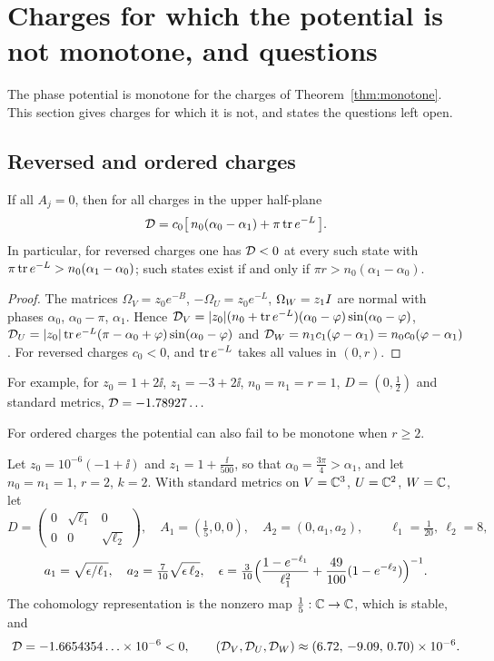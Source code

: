 \section{Charges for which the potential is not monotone, and questions}\label{sec:remarks}

The phase potential is monotone for the charges of
Theorem~\ref{thm:monotone}. This section gives charges for which it is not,
and states the questions left open.

\subsection{Reversed and ordered charges}
\begin{proposition}\label{prop:reversed}
If all $A_j=0$, then for all charges in the upper half-plane
\[
 \mathcal D=c_0\bigl[\,n_0(\alpha_0-\alpha_1)+\pi\operatorname{tr} e^{-L}\,\bigr].
\]
In particular, for reversed charges one has $\mathcal D<0$ at every such state with
$\pi\operatorname{tr} e^{-L}>n_0(\alpha_1-\alpha_0)$; such states exist if and only if
$\pi r>n_0(\alpha_1-\alpha_0)$.
\end{proposition}

\begin{proof}
The matrices $\Omega_V=z_0e^{-B}$, $-\Omega_U=z_0e^{-L}$, $\Omega_W=z_1I$
are normal with phases $\alpha_0$, $\alpha_0-\pi$, $\alpha_1$. Hence
$\mathcal D_V=|z_0|(n_0+\operatorname{tr} e^{-L})(\alpha_0-\varphi)\sin(\alpha_0-\varphi)$,
$\mathcal D_U=|z_0|\operatorname{tr} e^{-L}(\pi-\alpha_0+\varphi)\sin(\alpha_0-\varphi)$ and
$\mathcal D_W=n_1c_1(\varphi-\alpha_1)=n_0c_0(\varphi-\alpha_1)$. For reversed
charges $c_0<0$, and $\operatorname{tr} e^{-L}$ takes all values in $(0,r)$.
\end{proof}

For example, for $z_0=1+2\ii$, $z_1=-3+2\ii$, $n_0=n_1=r=1$, $D=(0,\frac12)$
and standard metrics, $\mathcal D=-1.78927\ldots$

For ordered charges the potential can also fail to be monotone when
$r\geq2$.

\begin{proposition}\label{prop:orderedfailure}
Let $z_0=10^{-6}(-1+\ii)$ and $z_1=1+\frac\ii{500}$, so that
$\alpha_0=\frac{3\pi}4>\alpha_1$, and let $n_0=n_1=1$, $r=2$, $k=2$. With
standard metrics on $V=\mathbb C^3$, $U=\mathbb C^2$, $W=\mathbb C$, let
\[
 D=\begin{pmatrix}0&\sqrt{\ell_1}&0\\0&0&\sqrt{\ell_2}\end{pmatrix},\quad
 A_1=(\tfrac15,0,0),\quad A_2=(0,a_1,a_2),\qquad\ell_1=\tfrac1{20},\ \ell_2=8,
\]
\[
 a_1=\sqrt{\epsilon/\ell_1},\quad a_2=\tfrac7{10}\sqrt{\epsilon\,\ell_2},\quad
 \epsilon=\tfrac3{10}\Bigl(\frac{1-e^{-\ell_1}}{\ell_1^2}+\frac{49}{100}(1-e^{-\ell_2})\Bigr)^{-1}.
\]
The cohomology representation is the nonzero map $\frac15:\mathbb C\to\mathbb C$, which
is stable, and
\[
 \mathcal D=-1.6654354\ldots\times10^{-6}<0,\qquad
 (\mathcal D_V,\mathcal D_U,\mathcal D_W)\approx(6.72,\,-9.09,\,0.70)\times10^{-6}.
\]
\end{proposition}

